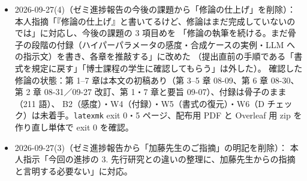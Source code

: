 \documentclass[11pt,a4paper]{jsarticle}
\begin{document}
\begin{itemize}[nosep]
    \textbf{訂正}：族名を as-published $\to$ \textbf{single-source}（単一出典）、cross-document $\to$ \textbf{cross-source}（出典横断）に改め、
    表 2 の列名を Documents spanned $\to$ Sources spanned にした（値は元から source\_id 単位なので不変）。
    修論は \texttt{Dataset.tex}（\S4.1 の内訳、\S4.2 の族の定義を書き直し、表 2、構成上の性質に「入出力変数は正解式の変数記号から取る（4 族とも 100\%）」を追加、\S4.4 の document $\to$ source）、
    \texttt{Experiment.tex}、\texttt{Introduction.tex}（内訳と族の説明を訂正し「表記の正規化」を削除）、
    \texttt{RelatedWork.tex}（出所の主張を「94\% が文献由来」に、LLM の役割に基礎式集の生成・単一出典の正解集合・出典横断の 33 組を追加）、
    \texttt{Method.tex}・\texttt{Conclusion.tex}（source document $\to$ source）、
    \texttt{ResultsAndDiscussion.tex}（\S6.2 の出典数、限界の第 1 項に単一出典の正解集合が LLM の選択であることを追加、第 5 項の理由を「入出力変数を正解式の記号から取る」に）を直した。
    図 \texttt{fig\_dataset}・\texttt{fig\_characteristic} はラベルだけ変えて再生成した（数値は不変）。
    08-31 の進捗報告（ltjsarticle 版・jresume 版）も内訳・呼称・表 2・出典単位の分割・限界の理由を同様に直し、表の後に単一出典と出典横断の作り方を追記した（8 ページ・7 ページを維持）。
    \texttt{docs/論文の主張\_2026-08-09.md} の用語表・改訂理由・Q5（合成ケースの式は 1,000 件中 939 件が文献由来のみ）も訂正した。
    性能・件数・平均などの数値は一切変わらない。\texttt{latexmk -gg} exit 0・32 ページ（本文 24 $\to$ 25 ページ）・未定義参照なし。
    出典の確認資料（92 件の一覧 CSV・抜粋 PDF 31 件・中小文献の全文 8 点）は本人に送付済み（リポジトリ外）。
  \item 2026-09-27(4)（ゼミ進捗報告の今後の課題から「修論の仕上げ」を削除）：
    本人指摘「『修論の仕上げ』と書いてるけど、修論はまだ完成していないのでは」に対応し、今後の課題の 3 項目めを
    「修論の執筆を続ける。まだ骨子の段階の付録（ハイパーパラメータの感度・合成ケースの実例・LLM への指示文）を書き、各章を推敲する」に改めた
    （提出直前の手順である「書式を規定に戻す」「博士課程の学生に確認してもらう」は外した）。
    確認した修論の状態：第 1--7 章は本文の初稿あり（第 3--5 章 08-09、第 6 章 08-30、第 2 章 08-31／09-27 改訂、第 1・7 章と要旨 09-07）、付録は骨子のまま（211 語）、
    B2（感度）・W4（付録）・W5（書式の復元）・W6（D チェック）は未着手。\texttt{latexmk} exit 0・5 ページ、配布用 PDF と Overleaf 用 zip を作り直し単体で exit 0 を確認。
  \item 2026-09-27(3)（ゼミ進捗報告から「加藤先生のご指摘」の明記を削除）：
    本人指示「今回の進捗の 3. 先行研究との違いの整理に、加藤先生からの指摘と言明する必要ない」に対応。

\end{itemize}
\end{document}
